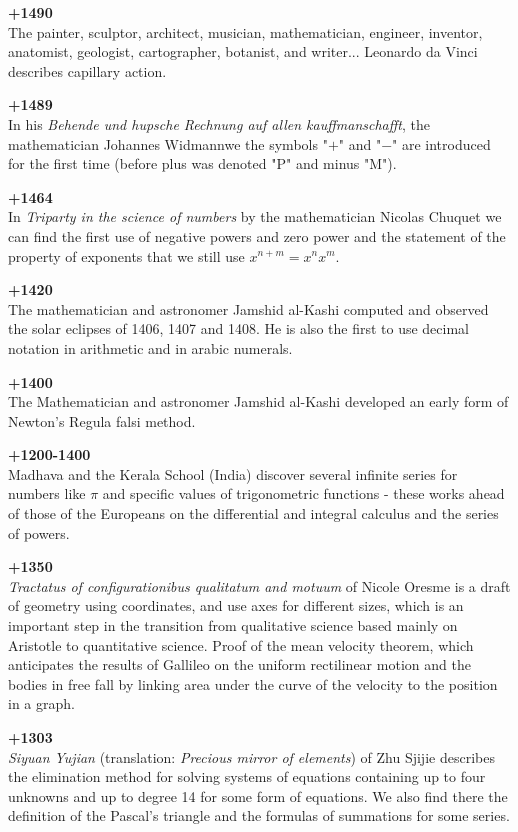 \textbf{+1490}\\
The painter, sculptor, architect, musician, mathematician, engineer, inventor, anatomist, geologist, cartographer, botanist, and writer... Leonardo da Vinci describes capillary action.

\textbf{+1489}\\
In his \textit{Behende und hupsche Rechnung auf allen kauffmanschafft}, the mathematician Johannes Widmannwe the symbols "$+$" and "$-$" are introduced for the first time (before plus was denoted "P" and minus "M").

\textbf{+1464}\\
In \textit{Triparty in the science of numbers} by the mathematician Nicolas Chuquet we can find the first use of negative powers and zero power and the statement of the property of exponents that we still use $x^{n+m}=x^nx^m$.

\textbf{+1420}\\
The mathematician and astronomer Jamshid al-Kashi computed and observed the solar eclipses of 1406, 1407 and 1408. He is also the first to use decimal notation in arithmetic and in arabic numerals.

\textbf{+1400}\\
The Mathematician and astronomer Jamshid al-Kashi developed an early form of Newton's Regula falsi method.

\textbf{+1200-1400}\\
Madhava and the Kerala School (India) discover several infinite series for numbers like $\pi$ and specific values of trigonometric functions - these works ahead of those of the Europeans on the differential and integral calculus and the series of powers.

\textbf{+1350}\\
\textit{Tractatus of configurationibus qualitatum and motuum} of Nicole Oresme is a draft of geometry using coordinates, and use axes for different sizes, which is an important step in the transition from qualitative science based mainly on Aristotle to quantitative science. Proof of the mean velocity theorem, which anticipates the results of Gallileo on the uniform rectilinear motion and the bodies in free fall by linking area under the curve of the velocity to the position in a graph.

\textbf{+1303}\\
\textit{Siyuan Yujian }(translation:\textit{ Precious mirror of elements}) of Zhu Sjijie describes the elimination method for solving systems of equations containing up to four unknowns and up to degree 14 for some form of equations. We also find there the definition of the Pascal's triangle and the formulas of summations for some series.

